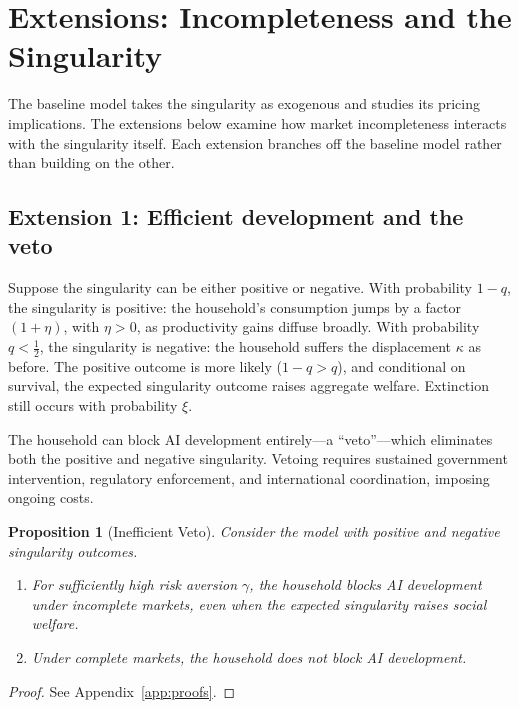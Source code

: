 \documentclass[12pt]{article}
\newtheorem{proposition}{Proposition}
\begin{document}
\section{Extensions: Incompleteness and the Singularity} %

The baseline model takes the singularity as exogenous and studies its pricing implications. The extensions below examine how market incompleteness interacts with the singularity itself. Each extension branches off the baseline model rather than building on the other.

\subsection{Extension 1: Efficient development and the veto} %

Suppose the singularity can be either positive or negative. With probability $1-q$, the singularity is positive: the household's consumption jumps by a factor $(1+\eta)$, with $\eta > 0$, as productivity gains diffuse broadly. With probability $q < \frac{1}{2}$, the singularity is negative: the household suffers the displacement $\kappa$ as before. The positive outcome is more likely ($1 - q > q$), and conditional on survival, the expected singularity outcome raises aggregate welfare. Extinction still occurs with probability $\xi$.

The household can block AI development entirely---a ``veto''---which eliminates both the positive and negative singularity. Vetoing requires sustained government intervention, regulatory enforcement, and international coordination, imposing ongoing costs.

\begin{proposition}[Inefficient Veto] \label{prop:veto} %
Consider the model with positive and negative singularity outcomes.
\begin{enumerate}
  \item[(a)] For sufficiently high risk aversion $\gamma$, the household blocks AI development under incomplete markets, even when the expected singularity raises social welfare.
  \item[(b)] Under complete markets, the household does not block AI development.
\end{enumerate}
\end{proposition}

\begin{proof}
See Appendix~\ref{app:proofs}.
\end{proof}
\end{document}
